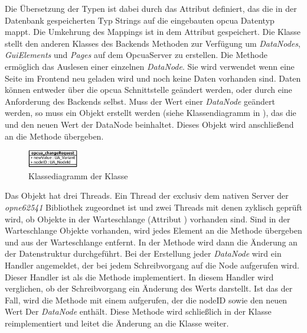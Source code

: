 Die Übersetzung der Typen ist dabei durch das Attribut  definiert, das die in der Datenbank gespeicherten Typ Strings auf die eingebauten \ac{opcua} Datentyp mappt.
Die Umkehrung des Mappings ist in dem Attribut  gespeichert.
Die Klasse  stellt den anderen Klasses des Backends Methoden zur Verfügung um \emph{DataNodes}, \emph{GuiElements} und \emph{Pages} auf dem OpcuaServer zu erstellen.
Die Methode  ermöglich das Auslesen einer einzelnen \emph{DataNode}. Sie wird verwendet wenn eine Seite im Frontend neu geladen wird und noch keine Daten vorhanden sind.
Daten können entweder über die \ac{opcua} Schnittstelle geändert werden, oder durch eine Anforderung des Backends selbst.
Muss der Wert einer \emph{DataNode} geändert werden, so muss ein  Objekt erstellt werden (siehe Klassendiagramm in ), 
das die  und den neuen Wert der DataNode beinhaltet. Dieses Objekt wird anschließend an die Methode  übergeben.
\begin{figure}[ht]
  \centering
  \includegraphics[width=0.2\textwidth]{content/hauptteil/umsetzungPoC/backend/uml/classesOfOverview/opcua_changeRequest.pdf}
  \caption{Klassediagramm der Klasse }
  \label{fig:backend:classDiag:opcuaCR}
\end{figure}
Das  Objekt hat drei Threads. Ein Thread der exclusiv dem nativen Server der \emph{opne62541} Bibliothek zugeordnet ist und zwei Threads mit denen zyklisch geprüft wird, 
ob  Objekte in der Warteschlange (Attribut ) vorhanden sind.
Sind in der Warteschlange  Objekte vorhanden, wird jedes Element an die Methode  übergeben und aus der Warteschlange entfernt.
In der Methode  wird dann die Änderung an der Datenstruktur durchgeführt.%
Bei der Erstellung jeder \emph{DataNode} wird ein Handler angemeldet, der bei jedem Schreibvorgang auf die Node aufgerufen wird.
Dieser Handler ist als die Methode  implementiert.
In diesem Handler wird verglichen, ob der Schreibvorgang ein Änderung des Werts darstellt. Ist das der Fall, wird die Methode  mit einem  aufgerufen, der die nodeID sowie den neuen Wert Der \emph{DataNode} enthält.
Diese Methode wird schließlich in der  Klasse reimplementiert und leitet die Änderung an die  Klasse weiter. 